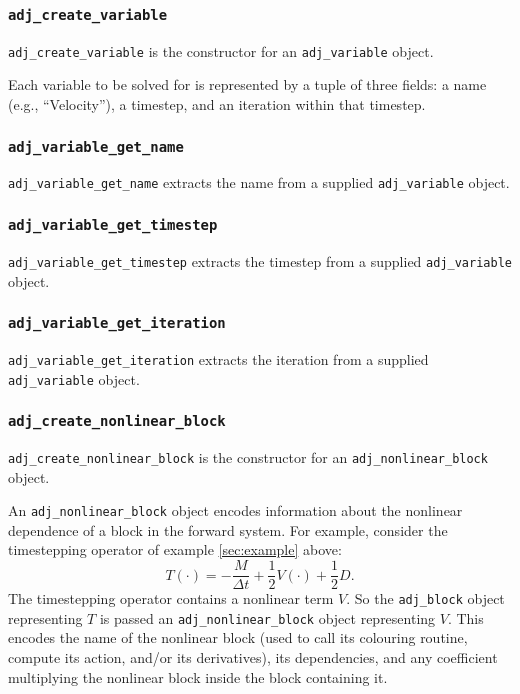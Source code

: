 \documentclass[10pt,authoryear]{elsarticle}
\begin{document}
\subsubsection{\texttt{{adj\_create\_variable}}}
\texttt{adj\_create\_variable} is the constructor for an \texttt{adj\_variable} object. 

Each variable to be solved for is represented by a tuple of three fields: a name (e.g., ``Velocity''), a timestep, and an iteration
within that timestep.
\subsubsection{\texttt{{adj\_variable\_get\_name}}}
\texttt{adj\_variable\_get\_name} extracts the name from a supplied \texttt{adj\_variable} object.

\subsubsection{\texttt{{adj\_variable\_get\_timestep}}}
\texttt{adj\_variable\_get\_timestep} extracts the timestep from a supplied \texttt{adj\_variable} object.

\subsubsection{\texttt{{adj\_variable\_get\_iteration}}}
\texttt{adj\_variable\_get\_iteration} extracts the iteration from a supplied \texttt{adj\_variable} object.

\subsubsection{\texttt{{adj\_create\_nonlinear\_block}}}
\texttt{adj\_create\_nonlinear\_block} is the constructor for an \texttt{adj\_nonlinear\_block} object. 

An \texttt{adj\_nonlinear\_block} object encodes information about the nonlinear dependence of a block in the forward system. 
For example, consider the timestepping operator of example \ref{sec:example} above:
\begin{equation}
T(\cdot) = -\frac{M}{\Delta t} + \frac{1}{2}V(\cdot) + \frac{1}{2}D.
\end{equation}
The timestepping operator contains a nonlinear term $V$. So the \texttt{adj\_block} object representing $T$ is passed
an \texttt{adj\_nonlinear\_block} object representing $V$. This encodes the name of the nonlinear block (used to call its
colouring routine, compute its action, and/or its derivatives), its dependencies, and any coefficient multiplying the nonlinear block
inside the block containing it.
\end{document}
